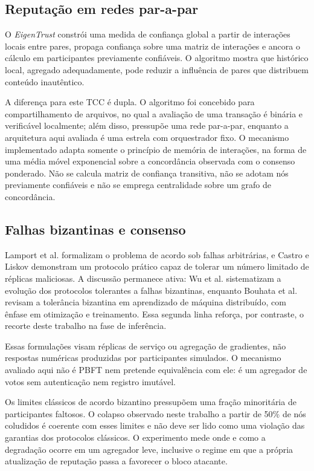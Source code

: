 \documentclass[12pt]{article}
\begin{document}
\subsection{Reputação em redes par-a-par}

O \textit{EigenTrust} \cite{kamvar2003} constrói uma medida de confiança global a partir de interações locais entre pares, propaga confiança sobre uma matriz de interações e ancora o cálculo em participantes previamente confiáveis. O algoritmo mostra que histórico local, agregado adequadamente, pode reduzir a influência de pares que distribuem conteúdo inautêntico.

A diferença para este TCC é dupla. O algoritmo foi concebido para compartilhamento de arquivos, no qual a avaliação de uma transação é binária e verificável localmente; além disso, pressupõe uma rede par-a-par, enquanto a arquitetura aqui avaliada é uma estrela com orquestrador fixo. O mecanismo implementado adapta somente o princípio de memória de interações, na forma de uma média móvel exponencial sobre a concordância observada com o consenso ponderado. Não se calcula matriz de confiança transitiva, não se adotam nós previamente confiáveis e não se emprega centralidade sobre um grafo de concordância.

\subsection{Falhas bizantinas e consenso}

Lamport et al. \cite{lamport1982} formalizam o problema de acordo sob falhas arbitrárias, e Castro e Liskov \cite{castro1999} demonstram um protocolo prático capaz de tolerar um número limitado de réplicas maliciosas. A discussão permanece ativa: Wu et al. \cite{wu2024} sistematizam a evolução dos protocolos tolerantes a falhas bizantinas, enquanto Bouhata et al. \cite{bouhata2025} revisam a tolerância bizantina em aprendizado de máquina distribuído, com ênfase em otimização e treinamento. Essa segunda linha reforça, por contraste, o recorte deste trabalho na fase de inferência.

Essas formulações visam réplicas de serviço ou agregação de gradientes, não respostas numéricas produzidas por participantes simulados. O mecanismo avaliado aqui não é PBFT nem pretende equivalência com ele: é um agregador de votos sem autenticação nem registro imutável.

Os limites clássicos de acordo bizantino pressupõem uma fração minoritária de participantes faltosos. O colapso observado neste trabalho a partir de 50\% de nós coludidos é coerente com esses limites e não deve ser lido como uma violação das garantias dos protocolos clássicos. O experimento mede onde e como a degradação ocorre em um agregador leve, inclusive o regime em que a própria atualização de reputação passa a favorecer o bloco atacante.
\end{document}
